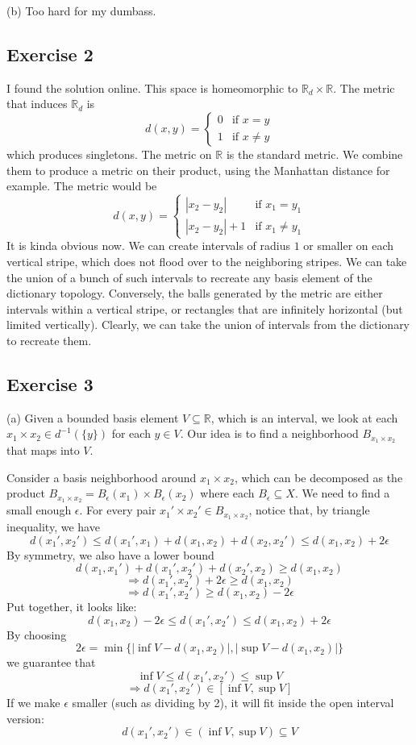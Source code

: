 \documentclass{book}
\begin{document}
\noindent
(b)
Too hard for my dumbass.

\subsection*{Exercise 2}
I found the solution online. This space is homeomorphic to $\mathbb{R}_d \times \mathbb{R}$. The metric that induces $\mathbb{R}_d$ is
$$d(x, y) = \begin{cases}
    0 & \text{if } x = y \\
    1 & \text{if } x \neq y
\end{cases}$$
which produces singletons. The metric on $\mathbb{R}$ is the standard metric. We combine them to produce a metric on their product, using the Manhattan distance for example. The metric would be
$$d(x, y) = \begin{cases}
    |x_2 - y_2| & \text{if } x_1 = y_1 \\
    |x_2 - y_2| + 1 & \text{if } x_1 \neq y_1
\end{cases}$$
It is kinda obvious now. We can create intervals of radius $1$ or smaller on each vertical stripe, which does not flood over to the neighboring stripes. We can take the union of a bunch of such intervals to recreate any basis element of the dictionary topology. Conversely, the balls generated by the metric are either intervals within a vertical stripe, or rectangles that are infinitely horizontal (but limited vertically). Clearly, we can take the union of intervals from the dictionary to recreate them.

\subsection*{Exercise 3}
(a)
Given a bounded basis element $V \subseteq \mathbb{R}$, which is an interval, we look at each $x_1 \times x_2 \in d^{-1}(\{ y \})$ for each $y \in V$. Our idea is to find a neighborhood $B_{x_1 \times x_2}$ that maps into $V$.

Consider a basis neighborhood around $x_1 \times x_2$, which can be decomposed as the product $B_{x_1 \times x_2} = B_\epsilon (x_1) \times B_\epsilon (x_2)$ where each $B_\epsilon \subseteq X$. We need to find a small enough $\epsilon$. For every pair $x_1' \times x_2' \in B_{x_1 \times x_2}$, notice that, by triangle inequality, we have
$$d(x_1', x_2') \leq d(x_1', x_1) + d(x_1, x_2) + d(x_2, x_2') \leq d(x_1, x_2) + 2\epsilon$$
By symmetry, we also have a lower bound
$$d(x_1, x_1') + d(x_1', x_2') + d(x_2', x_2) \geq d(x_1, x_2)$$
$$\Rightarrow d(x_1', x_2') + 2\epsilon \geq d(x_1, x_2)$$
$$\Rightarrow d(x_1', x_2') \geq d(x_1, x_2) - 2\epsilon$$
Put together, it looks like:
$$d(x_1, x_2) - 2\epsilon \leq d(x_1', x_2') \leq d(x_1, x_2) + 2\epsilon$$
By choosing
$$2\epsilon = \min \{ |\inf V - d(x_1, x_2)|, |\sup V - d(x_1, x_2)| \}$$
we guarantee that
$$\inf V \leq d(x_1', x_2') \leq \sup V$$
$$\Rightarrow d(x_1', x_2') \in [\inf V, \sup V]$$
If we make $\epsilon$ smaller (such as dividing by 2), it will fit inside the open interval version:
$$d(x_1', x_2') \in (\inf V, \sup V) \subseteq V$$
\end{document}

